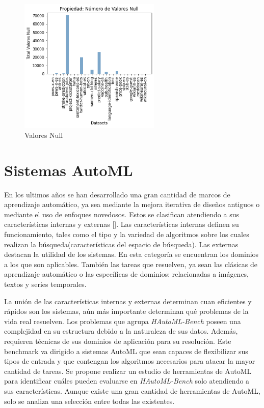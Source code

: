 \begin{figure}[!tbp]
    \centering
    \includegraphics[width= 0.6\textwidth]{Graphics/results/null_values.png}
        \caption{Valores Null}
        \label{fig:null}
\end{figure}

\section{Sistemas AutoML}\label{section:AutoML}

En los ultimos años se han desarrollado una gran cantidad de marcos de aprendizaje automático, ya sea mediante la mejora iterativa de diseños antiguos o mediante 
el uso de enfoques novedosos. Estos se clasifican atendiendo a sus características internas y externas [\cite{52}]. Las características internas definen su 
funcionamiento, tales como el tipo y la variedad de algoritmos sobre los cuales realizan la búsqueda(características del espacio de búsqueda). Las externas 
destacan la utilidad de los sistemas. En esta categoría se encuentran los dominios a los que son aplicables. También las tareas que resuelven, ya sean las clásicas de 
aprendizaje automático o las específicas de dominios: relacionadas a imágenes, textos y series temporales. 

La unión de las características internas y externas determinan cuan eficientes y rápidos son los sistemas, aún más importante determinan qué problemas de la 
vida real resuelven.
Los problemas que agrupa \textit{HAutoML-Bench} poseen una complejidad en su estructura debido a la naturaleza de sus datos. Además, 
requieren técnicas de sus dominios de aplicación para su resolución. Este benchmark va dirigido a sistemas AutoML que sean capaces de flexibilizar sus tipos de entrada 
y que contengan los algoritmos necesarios para atacar la mayor cantidad de tareas. 
Se propone realizar un estudio de herramientas de AutoML para identificar cuáles pueden evaluarse en \textit{HAutoML-Bench} solo atendiendo a sus características.
Aunque existe una gran cantidad de herramientas de AutoML, solo se analiza una selección entre todas las existentes.

